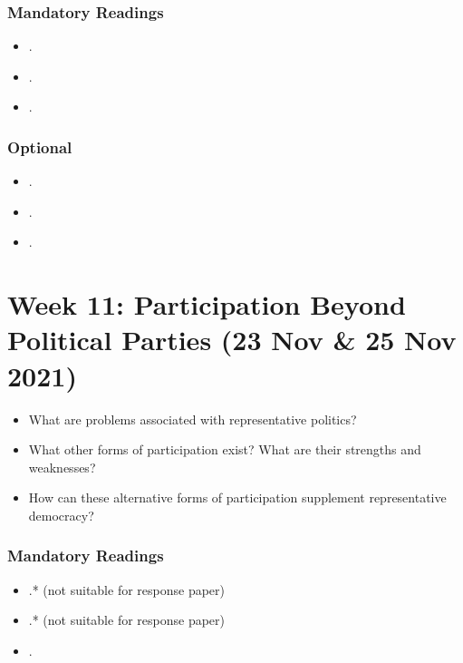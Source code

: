\documentclass[abstract=on,parskip=full,headings=standardclasses,fontsize=11pt,paper=a4]{scrartcl}
\begin{document}
\subsubsection*{Mandatory Readings}


 \begin{itemize}
\item {}.
\item {}.
\item {}.
\end{itemize}

\subsubsection*{Optional}
\begin{itemize}
\item {}.
\item {}.
\item {}.
\end{itemize}



\section{Week 11: Participation Beyond Political Parties (23 Nov \& 25 Nov 2021)}

\begin{itemize}
\renewcommand\labelitemi{--}
\item What are problems associated with representative politics?
\item What other forms of participation exist? What are their strengths and weaknesses?
\item How can these alternative forms of participation supplement representative democracy?
\end{itemize}

\subsubsection*{Mandatory Readings}
\begin{itemize}
\item {}.* (not suitable for response paper)
\item {}.* (not suitable for response paper)
\item {}.
\end{itemize}
\end{document}
